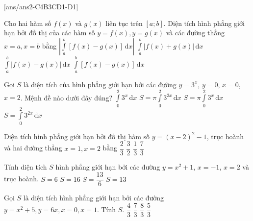 {}[ans/ans2-C4B3CD1-D1]
\begin{ex}%
	Cho hai hàm số $f(x)$ và $g(x)$ liên tục trên $[a;b]$. Diện tích hình phẳng giới hạn bởi đồ thị của các hàm số $y=f(x), y=g(x)$ và các đường thẳng $x=a, x=b$ bằng
\choice
{$\left|\displaystyle\int\limits_a^b \left[f(x)-g(x)\right]\mathrm{\,d}x\right|$}
{$\displaystyle\int\limits_a^b \left|f(x)+g(x)\right|\mathrm{\,d}x$}
{\True $\displaystyle\int\limits_a^b \left|f(x)-g(x)\right|\mathrm{\,d}x$}
{$\displaystyle\int\limits_a^b \left[f(x)-g(x)\right]\mathrm{\,d}x$}
\end{ex}
\begin{ex}%
	Gọi $S$ là diện tích của hình phẳng giới hạn bởi các đường $y=3^x$, $y=0$, $x=0$, $x=2$. Mệnh đề nào dưới đây đúng?
\choice
{\True $\displaystyle\int\limits_0^2 3^x\mathrm{\,d}x$}
{$S=\pi\displaystyle\int\limits_0^2 3^{2x}\mathrm{\,d}x$}
{$S=\pi\displaystyle\int\limits_0^2 3^x\mathrm{\,d}x$}
{$S=\displaystyle\int\limits_0^2 3^{2x}\mathrm{\,d}x$}

\end{ex}%
\begin{ex}%
	Diện tích hình phẳng giới hạn bởi đồ thị hàm số $y=(x-2)^2-1$, trục hoành và hai đường thẳng $x=1, x=2$ bằng
\choice
{\True $\dfrac{2}{3}$}
{$\dfrac{3}{2}$}
{$\dfrac{1}{3}$}
{$\dfrac{7}{3}$}

\end{ex}
\begin{ex}%
	Tính diện tích $S$ hình phẳng giới hạn bởi các đường $y=x^2+1$, $x=-1$, $x=2$ và trục hoành.
\choice
{\True $S=6$}
{$S=16$}
{$S=\dfrac{13}{6}$}
{$S=13$}
\end{ex}
\begin{ex}%
	Gọi $S$ là diện tích hình phẳng giới hạn bởi các đường $y=x^2+5, y=6 x, x=0, x=1$. Tính $S$.
\choice
{$\dfrac{4}{3}$}
{\True $\dfrac{7}{3}$}
{$\dfrac{8}{3}$}
{$\dfrac{5}{3}$}
\end{ex}
